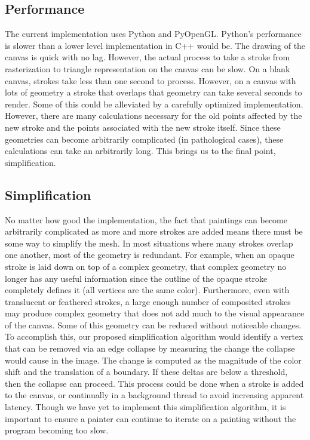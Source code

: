 \documentclass[review]{acmsiggraph}
\begin{document}
\subsection{Performance}
The current implementation uses Python and PyOpenGL. Python's performance is slower than
a lower level implementation in C++ would be. The drawing of the canvas is quick with
no lag. However, the actual process to take a stroke from rasterization to triangle
representation on the canvas can be slow. On a blank canvas, strokes take less than
one second to process. However, on a canvas with lots of geometry a stroke that overlaps
that geometry can take several seconds to render. Some of this could be alleviated by a carefully optimized implementation. However, there are many calculations
necessary for the old points affected by the new stroke and the points associated with the
new stroke itself. Since these geometries can become arbitrarily complicated (in pathological cases), these
calculations can take an arbitrarily long. This brings us to the final point, simplification.

\subsection{Simplification}
No matter how good the implementation, the fact that paintings can become arbitrarily complicated as more and more strokes are added
means there must be some way to simplify the mesh. In most situations where
many strokes overlap one another, most of the geometry is redundant. For example, when an opaque stroke is laid down on top of a complex geometry, that complex
geometry no longer has any useful information since the outline of the opaque stroke
completely defines it (all vertices are the same color).  Furthermore, even with translucent or feathered strokes, a large enough number of 
composited strokes may produce complex geometry that does not add much to the visual appearance of the canvas. Some of this geometry can be reduced without noticeable changes.  To accomplish this, our proposed simplification algorithm would identify a vertex that can be removed via an edge collapse by measuring the change the collapse would cause in the image.  The change is computed as the magnitude of the color shift and the translation of a boundary.  If these deltas are below a threshold, then the collapse can proceed.  This process could be done when a stroke is added to the canvas, or continually in a background thread to avoid increasing apparent latency.  Though we have yet to implement this simplification algorithm, it is important to ensure a painter can continue to iterate on a painting without the program becoming too slow.
\end{document}
